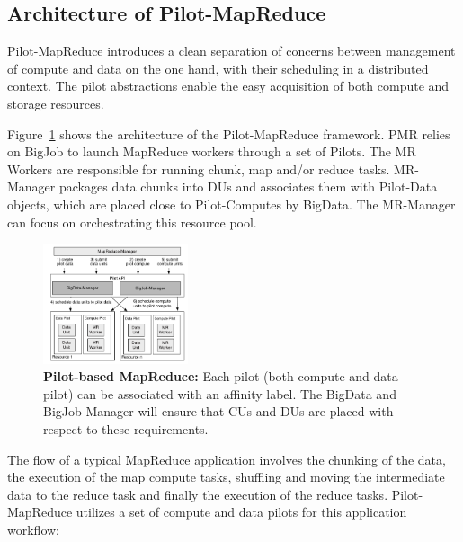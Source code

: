 \documentclass{sig-alternate}
\newcommand{\alnote}[1]{ {\textcolor{blue} { ***andreL: #1 }}}
\newcommand{\alnote}[1]{}
\newcommand{\upp}{\vspace*{-0.5em}}
\newcommand{\pilots}{Pilots\xspace}
\newcommand{\pilotcomputes}{Pilot-Computes\xspace}
\newcommand{\pilotmapreduce}{Pilot-MapReduce\xspace}
\newcommand{\mrmg}{MR-Manager\xspace}
\newcommand{\dus}{DUs\xspace}
\newcommand{\pilotdata}{Pilot-Data\xspace}
\begin{document}


\upp
\subsection{Architecture of \pilotmapreduce}
\pilotmapreduce introduces a clean separation of concerns between
management of compute and data on the one hand, with their scheduling
in a distributed context. The pilot abstractions enable the easy
acquisition of both compute and storage resources. 
 
Figure~\ref{fig:figures_mapreduce-pilotdata} shows the architecture of
the \pilotmapreduce framework. PMR relies on BigJob to launch
MapReduce workers through a set of \pilots. The MR Workers are
responsible for running chunk, map and/or reduce tasks. \mrmg packages
data chunks into \dus and associates them with \pilotdata objects,
which are placed close to \pilotcomputes by BigData.  The \mrmg can
focus on orchestrating this resource pool.



\begin{figure}[t]
	\centering
	\includegraphics[width=0.38\textwidth]{figures/mr-arch.pdf}
	\caption{\textbf{Pilot-based MapReduce:} Each pilot (both compute and data 
	pilot) can be associated with an affinity label. The BigData and BigJob 
	Manager will ensure that CUs and DUs are placed with respect to these 
	requirements.\upp}
	\label{fig:figures_mapreduce-pilotdata}
\end{figure}

The flow of a typical MapReduce application involves the chunking of
the data, the execution of the map compute tasks, shuffling and moving
the intermediate data to the reduce task and finally the execution of
the reduce tasks.  \pilotmapreduce utilizes a set of compute and data
pilots for this application workflow:
\end{document}
